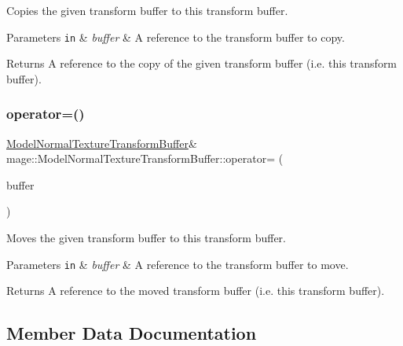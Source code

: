 Copies the given transform buffer to this transform buffer.


\begin{DoxyParams}[1]{Parameters}
\mbox{\tt in}  & {\em buffer} & A reference to the transform buffer to copy. \\
\hline
\end{DoxyParams}
\begin{DoxyReturn}{Returns}
A reference to the copy of the given transform buffer (i.\+e. this transform buffer). 
\end{DoxyReturn}
\hypertarget{structmage_1_1_model_normal_texture_transform_buffer_aa5c10733681849e37988a9d1bf75a637}{}\label{structmage_1_1_model_normal_texture_transform_buffer_aa5c10733681849e37988a9d1bf75a637} 
\subsubsection{\texorpdfstring{operator=()}{operator=()}\hspace{0.1cm}{\footnotesize\ttfamily [2/2]}}
{\footnotesize\ttfamily \hyperlink{structmage_1_1_model_normal_texture_transform_buffer}{Model\+Normal\+Texture\+Transform\+Buffer}\& mage\+::\+Model\+Normal\+Texture\+Transform\+Buffer\+::operator= (\begin{DoxyParamCaption}\item[{\hyperlink{structmage_1_1_model_normal_texture_transform_buffer}{Model\+Normal\+Texture\+Transform\+Buffer} \&\&}]{buffer }\end{DoxyParamCaption})\hspace{0.3cm}{\ttfamily [default]}}

Moves the given transform buffer to this transform buffer.


\begin{DoxyParams}[1]{Parameters}
\mbox{\tt in}  & {\em buffer} & A reference to the transform buffer to move. \\
\hline
\end{DoxyParams}
\begin{DoxyReturn}{Returns}
A reference to the moved transform buffer (i.\+e. this transform buffer). 
\end{DoxyReturn}


\subsection{Member Data Documentation}
\hypertarget{structmage_1_1_model_normal_texture_transform_buffer_a2e8950b98f36bd1ad6d5b35a8db298a9}{}\label{structmage_1_1_model_normal_texture_transform_buffer_a2e8950b98f36bd1ad6d5b35a8db298a9} 
